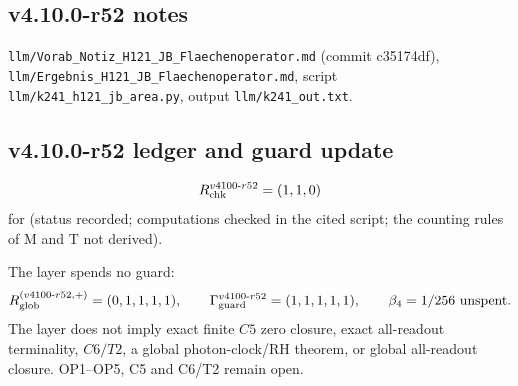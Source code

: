 \subsection*{v4.10.0-r52 notes}
\label{subsec:v4100-r52-notes}

\texttt{llm/\allowbreak Vorab\_\allowbreak Notiz\_\allowbreak H121\_\allowbreak JB\_\allowbreak Flaechenoperator.md} (commit c35174df),
\texttt{llm/\allowbreak Ergebnis\_\allowbreak H121\_\allowbreak JB\_\allowbreak Flaechenoperator.md}, script \texttt{llm/\allowbreak k241\_\allowbreak h121\_\allowbreak jb\_\allowbreak area.py},
output \texttt{llm/\allowbreak k241\_\allowbreak out.txt}.

\subsection*{v4.10.0-r52 ledger and guard update}
\label{subsec:v4100-r52-ledger-guard}

\[
R_{\rm chk}^{v4100\text{-}r52}=(1,1,0)
\]
for (status recorded; computations checked in the cited script; the counting rules of M and T not derived).

The layer spends no guard:
\[
R_{\rm glob}^{(v4100\text{-}r52,+)}=(0,1,1,1,1),
\qquad
\Gamma_{\rm guard}^{v4100\text{-}r52}=(1,1,1,1,1),
\qquad
\beta_4=1/256\ \text{unspent}.
\]
The layer does not imply exact finite \(C5\) zero closure, exact all-readout terminality, \(C6/T2\), a global photon-clock/RH theorem,
or global all-readout closure.  OP1--OP5, C5 and C6/T2 remain open.
